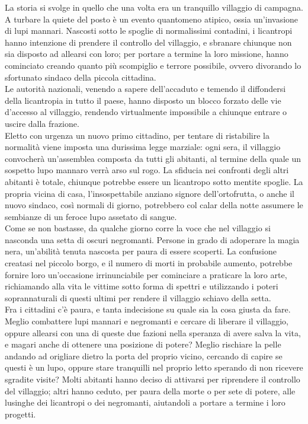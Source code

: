 \documentclass[a4paper,10pt]{article}
\begin{document}
La storia si svolge in quello che una volta era un tranquillo villaggio di campagna. A turbare la quiete del posto è un evento quantomeno atipico, ossia un'invasione di lupi mannari. Nascosti sotto le spoglie di normalissimi contadini, i licantropi hanno intenzione di prendere il controllo del villaggio, e sbranare chiunque non sia disposto ad allearsi con loro; per portare a termine la loro missione, hanno cominciato creando quanto più scompiglio e terrore possibile, ovvero divorando lo sfortunato sindaco della piccola cittadina.\\
Le autorità nazionali, venendo a sapere dell'accaduto e temendo il diffondersi della licantropia in tutto il paese, hanno disposto un blocco forzato delle vie d'accesso al villaggio, rendendo virtualmente impossibile a chiunque entrare o uscire dalla frazione.\\
Eletto con urgenza un nuovo primo cittadino, per tentare di ristabilire la normalità viene imposta una durissima legge marziale: ogni sera, il villaggio convocherà un'assemblea composta da tutti gli abitanti, al termine della quale un sospetto lupo mannaro verrà arso sul rogo. La sfiducia nei confronti degli altri abitanti è totale, chiunque potrebbe essere un licantropo sotto mentite spoglie. La propria vicina di casa, l'insospettabile anziano signore dell'ortofrutta, o anche il nuovo sindaco, così normali di giorno, potrebbero col calar della notte assumere le sembianze di un feroce lupo assetato di sangue.\\
Come se non bastasse, da qualche giorno corre la voce che nel villaggio si nasconda una setta di oscuri negromanti. Persone in grado di adoperare la magia nera, un'abilità tenuta nascosta per paura di essere scoperti. La confusione creatasi nel piccolo borgo, e il numero di morti in probabile aumento, potrebbe fornire loro un'occasione irrinunciabile per cominciare a praticare la loro arte, richiamando alla vita le vittime sotto forma di spettri e utilizzando i poteri soprannaturali di questi ultimi per rendere il villaggio schiavo della setta.\\
Fra i cittadini c'è paura, e tanta indecisione su quale sia la cosa giusta da fare. Meglio combattere lupi mannari e negromanti e cercare di liberare il villaggio, oppure allearsi con una di queste due fazioni nella speranza di avere salva la vita, e magari anche di ottenere una posizione di potere? Meglio rischiare la pelle andando ad origliare dietro la porta del proprio vicino, cercando di capire se questi è un lupo, oppure stare tranquilli nel proprio letto sperando di non ricevere sgradite visite? Molti abitanti hanno deciso di attivarsi per riprendere il controllo del villaggio; altri hanno ceduto, per paura della morte o per sete di potere, alle lusinghe dei licantropi o dei negromanti, aiutandoli a portare a termine i loro progetti.\\
\end{document}
